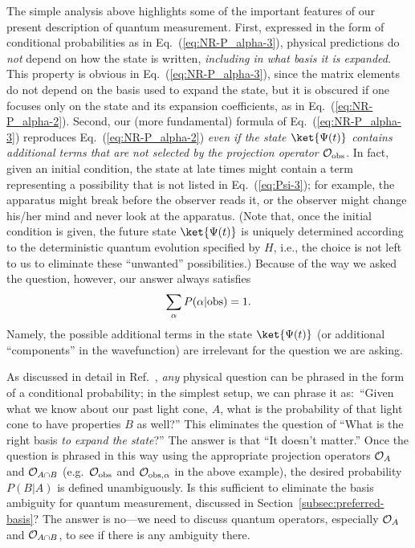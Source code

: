 \documentclass[12pt]{article}
\begin{document}
The simple analysis above highlights some of the important features of 
our present description of quantum measurement.  First, expressed in 
the form of conditional probabilities as in Eq.~(\ref{eq:NR-P_alpha-3}), 
physical predictions do {\it not} depend on how the state is written, 
{\it including in what basis it is expanded}.  This property is obvious 
in Eq.~(\ref{eq:NR-P_alpha-3}), since the matrix elements do not 
depend on the basis used to expand the state, but it is obscured if 
one focuses only on the state and its expansion coefficients, as in 
Eq.~(\ref{eq:NR-P_alpha-2}).  Second, our (more fundamental) formula 
of Eq.~(\ref{eq:NR-P_alpha-3}) reproduces Eq.~(\ref{eq:NR-P_alpha-2}) 
{\it even if the state $\ket{\Psi(t)}$ contains additional terms that 
are not selected by the projection operator ${\cal O}_{\rm obs}$}. 
In fact, given an initial condition, the state at late times might 
contain a term representing a possibility that is not listed in 
Eq.~(\ref{eq:Psi-3}); for example, the apparatus might break before 
the observer reads it, or the observer might change his/her mind and 
never look at the apparatus.  (Note that, once the initial condition 
is given, the future state $\ket{\Psi(t)}$ is uniquely determined 
according to the deterministic quantum evolution specified by $H$, 
i.e., the choice is not left to us to eliminate these ``unwanted'' 
possibilities.)  Because of the way we asked the question, however, 
our answer always satisfies
%
\begin{equation}
  \sum_\alpha P(\alpha|{\rm obs}) = 1.
\label{eq:P-sum}
\end{equation}
%
Namely, the possible additional terms in the state $\ket{\Psi(t)}$ (or 
additional ``components'' in the wavefunction) are irrelevant for the 
question we are asking.

As discussed in detail in Ref.~\cite{Nomura:2011dt}, {\it any} physical 
question can be phrased in the form of a conditional probability; 
in the simplest setup, we can phrase it as:\ ``Given what we know 
about our past light cone, $A$, what is the probability of that 
light cone to have properties $B$ as well?''  This eliminates the 
question of ``What is the right basis {\it to expand the state}?'' 
The answer is that ``It doesn't matter.''  Once the question is 
phrased in this way using the appropriate projection operators 
${\cal O}_A$ and ${\cal O}_{A \cap B}$ (e.g.\ ${\cal O}_{\rm obs}$ 
and ${\cal O}_{{\rm obs},\alpha}$ in the above example), the desired 
probability $P(B|A)$ is defined unambiguously.  Is this sufficient 
to eliminate the basis ambiguity for quantum measurement, discussed 
in Section~\ref{subsec:preferred-basis}?  The answer is no---we 
need to discuss quantum operators, especially ${\cal O}_A$ and 
${\cal O}_{A \cap B}$, to see if there is any ambiguity there.
\end{document}
